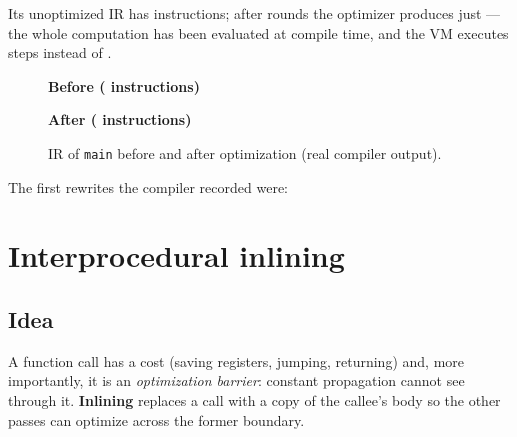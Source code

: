 Its unoptimized IR has \OptDemoBefore{} instructions; after \OptDemoRounds{} rounds the optimizer produces just \OptDemoAfter{} --- the whole computation has been evaluated at compile time, and the VM executes \OptDemoVMAfter{} steps instead of \OptDemoVMBefore{}.

\begin{figure}[H]
\begin{minipage}[t]{0.48\textwidth}\centering\textbf{Before (\OptDemoBefore{} instructions)}\\[-4pt]\begingroup\lstset{style=tiny}\endgroup\end{minipage}\hfill
\begin{minipage}[t]{0.48\textwidth}\centering\textbf{After (\OptDemoAfter{} instructions)}\\[-4pt]\begingroup\lstset{style=tiny}\endgroup\end{minipage}
\caption{IR of \texttt{main} before and after optimization (real compiler output).}
\end{figure}

The first rewrites the compiler recorded were:

\begingroup\small\endgroup
{}


\section{Interprocedural inlining}\label{sec:inlining}
\subsection{Idea}
A function call has a cost (saving registers, jumping, returning) and, more importantly, it is an \emph{optimization barrier}: constant propagation cannot see through it. \textbf{Inlining} replaces a call with a copy of the callee's body so the other passes can optimize across the former boundary.

